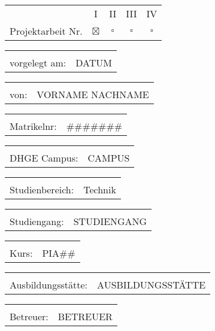 \maketitle

\begin{tabular}{rcccc}
	     \hspace{5cm} &       I       &     II      &     III     &     IV      \\
	Projektarbeit Nr. & $ \boxtimes $ & $ \square $ & $ \square $ & $ \square $
\end{tabular}

\begin{tabular}{rl}
	 \hspace{5cm} &       \\
	vorgelegt am: & DATUM
\end{tabular}

\begin{tabular}{rl}
	\hspace{5cm} &              \\
	        von: & VORNAME NACHNAME
\end{tabular}

\begin{tabular}{rl}
	\hspace{5cm} &         \\
	 Matrikelnr: & \#\#\#\#\#\#\#
\end{tabular}

\begin{tabular}{rl}
	\hspace{5cm} &      \\
	DHGE Campus: & CAMPUS
\end{tabular}

\begin{tabular}{rl}
	   \hspace{5cm} &         \\
	Studienbereich: & Technik
\end{tabular}

\begin{tabular}{rl}
	\hspace{5cm} &                       \\
	Studiengang: & STUDIENGANG
\end{tabular}

\begin{tabular}{rl}
	\hspace{5cm} &       \\
	       Kurs: & PIA\#\#
\end{tabular}

\begin{tabular}{rl}
	      \hspace{5cm} &          \\
	Ausbildungsstätte: & AUSBILDUNGSSTÄTTE
\end{tabular}

\begin{tabular}{rl}
	\hspace{5cm} &          \\
	   Betreuer: & BETREUER
\end{tabular}

\pagebreak